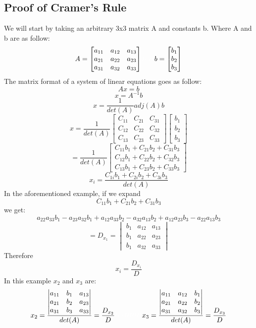 \documentclass{article}
\theoremstyle{plain}
\begin{document}
\subsection*{Proof of Cramer's Rule}
We will start by taking an arbitrary 3x3 matrix A and constants b. Where A and b are as follow:
\[A = \begin{bmatrix}
a_{11} & a_{12} & a_{13}\\
a_{21} & a_{22} & a_{23}\\
a_{31} & a_{32} & a_{33}
\end{bmatrix}\color{white}text\color{black}b = \begin{bmatrix}
b_1\\
b_2\\
b_3
\end{bmatrix} \]
The matrix format of a system of linear equations goes as follow:
\[ A x = b\]
\[ x = A^{-1} b\]
\[ x = \frac{1}{det(A)}adj(A) b\]
\[ x = \frac{1}{det(A)} \begin{bmatrix}
C_{11} & C_{21} & C_{31}\\
C_{12} & C_{22} & C_{32}\\
C_{13} & C_{23} & C_{33}
\end{bmatrix} \begin{bmatrix}
b_1\\
b_2\\
b_3
\end{bmatrix}\]
\[=\frac{1}{det(A)}\begin{bmatrix}
C_{11}b_1 + C_{21}b_2 + C_{31}b_3\\
C_{12}b_1 + C_{22}b_2 + C_{32}b_3\\
C_{13}b_1 + C_{23}b_2 + C_{33}b_3
\end{bmatrix} \]
\[x_i = \frac{C_{1i}b_1 + C_{2i}b_2 + C_{3i}b_3}{det(A)}\]
In the aforementioned example, if we expand \[C_{11}b_1 + C_{21}b_2 + C_{31}b_3\] we get:
\[a_{22}a_{33}b_1 - a_{23}a_{32}b_1 + a_{12}a_{33}b_2 - a_{32}a_{13}b_2 + a_{12}a_{23}b_3 - a_{22}a_{13}b_3\]
\[= D_{x_1} = \begin{vmatrix}
b_1 & a_{12} & a_{13}\\
b_1 & a_{22} & a_{23}\\
b_1 & a_{32} & a_{33}
\end{vmatrix}\]
Therefore \[x_i = \frac{D_{x_i}}{D}\]
In this example $x_2$ and $x_3$ are:
\[x_2 = \frac{\begin{vmatrix}
a_{11} & b_1 & a_{13}\\
a_{21} & b_2 & a_{23}\\
a_{31} & b_3 & a_{33}
\end{vmatrix}}{det(A)} = \frac{D_{x_2}}{D} \color{white}texttttttt\color{black}x_3 = \frac{\begin{vmatrix}
a_{11} & a_{12} & b_1\\
a_{21} & a_{22} & b_2\\
a_{31} & a_{32} & b_3
\end{vmatrix}}{det(A)} = \frac{D_{x_3}}{D}\]
\end{document}
